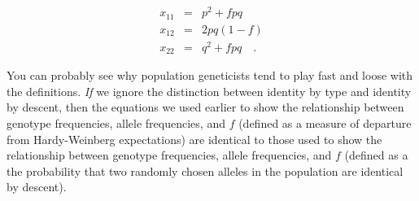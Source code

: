 \begin{eqnarray}
x_{11} &=& p^2 + fpq \\
x_{12} &=& 2pq(1-f) \\
x_{22} &=& q^2 + fpq \quad .
\end{eqnarray}

You can probably see why population geneticists tend to play fast and
loose with the definitions. {\it If\/} we ignore the distinction
between identity by type and identity by descent, then the equations
we used earlier to show the relationship between genotype frequencies,
allele frequencies, and $f$ (defined as a measure of departure from
Hardy-Weinberg expectations) are identical to those used to show the
relationship between genotype frequencies, allele frequencies, and $f$
(defined as a the probability that two randomly chosen alleles in the
population are identical by descent).

